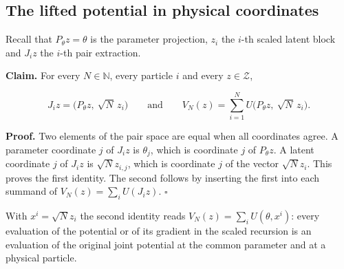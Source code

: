 \documentclass[11pt,a4paper]{report}
\begin{document}
\subsection{\texorpdfstring{The lifted potential in physical coordinates}{The lifted potential in physical coordinates}}
\label{report-step-IPLA-Dynamics-lean-1}


Recall that \(P_\theta z=\theta\) is the parameter projection, \(z_i\) the \(i\)-th scaled latent block and \(J_iz\) the \(i\)-th pair extraction.




\textbf{Claim.} For every \(N\in\mathbb N\), every particle \(i\) and every \(z\in\mathcal Z\),


\[J_iz=\bigl(P_\theta z,\ \sqrt N\,z_i\bigr)\qquad\text{and}\qquad V_N(z)=\sum_{i=1}^NU\bigl(P_\theta z,\ \sqrt N\,z_i\bigr).\]


\textbf{Proof.} Two elements of the pair space are equal when all coordinates agree. A parameter coordinate \(j\) of \(J_iz\) is \(\theta_j\), which is coordinate \(j\) of \(P_\theta z\). A latent coordinate \(j\) of \(J_iz\) is \(\sqrt N z_{i,j}\), which is coordinate \(j\) of the vector \(\sqrt N z_i\). This proves the first identity. The second follows by inserting the first into each summand of \(V_N(z)=\sum_iU(J_iz)\). \(\square\)




With \(x^i=\sqrt Nz_i\) the second identity reads \(V_N(z)=\sum_iU(\theta,x^i)\): every evaluation of the potential or of its gradient in the scaled recursion is an evaluation of the original joint potential at the common parameter and at a physical particle.
\end{document}
